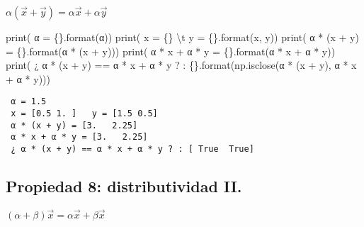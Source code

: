 \documentclass[
  letterpaper,
  DIV=11,
  numbers=noendperiod]{scrreprt}
\newenvironment{Shaded}{\begin{snugshade}}{\end{snugshade}}
\newcommand{\BuiltInTok}[1]{\textcolor[rgb]{0.00,0.23,0.31}{#1}}
\newcommand{\CharTok}[1]{\textcolor[rgb]{0.13,0.47,0.30}{#1}}
\newcommand{\NormalTok}[1]{\textcolor[rgb]{0.00,0.23,0.31}{#1}}
\newcommand{\OperatorTok}[1]{\textcolor[rgb]{0.37,0.37,0.37}{#1}}
\newcommand{\SpecialCharTok}[1]{\textcolor[rgb]{0.37,0.37,0.37}{#1}}
\newcommand{\StringTok}[1]{\textcolor[rgb]{0.13,0.47,0.30}{#1}}
\begin{document}
\(\alpha (\vec{x} + \vec{y}) = \alpha \vec{x} + \alpha \vec{y}\)

\begin{Shaded}
\begin{Highlighting}[]
\BuiltInTok{print}\NormalTok{(}\StringTok{\textquotesingle{} α = }\SpecialCharTok{\{\}}\StringTok{\textquotesingle{}}\NormalTok{.}\BuiltInTok{format}\NormalTok{(α))}
\BuiltInTok{print}\NormalTok{(}\StringTok{\textquotesingle{} x = }\SpecialCharTok{\{\}}\StringTok{ }\CharTok{\textbackslash{}t}\StringTok{ y = }\SpecialCharTok{\{\}}\StringTok{\textquotesingle{}}\NormalTok{.}\BuiltInTok{format}\NormalTok{(x, y))}
\BuiltInTok{print}\NormalTok{(}\StringTok{\textquotesingle{} α * (x + y) = }\SpecialCharTok{\{\}}\StringTok{\textquotesingle{}}\NormalTok{.}\BuiltInTok{format}\NormalTok{(α }\OperatorTok{*}\NormalTok{ (x }\OperatorTok{+}\NormalTok{ y)))}
\BuiltInTok{print}\NormalTok{(}\StringTok{\textquotesingle{} α * x + α * y = }\SpecialCharTok{\{\}}\StringTok{\textquotesingle{}}\NormalTok{.}\BuiltInTok{format}\NormalTok{(α }\OperatorTok{*}\NormalTok{ x }\OperatorTok{+}\NormalTok{ α }\OperatorTok{*}\NormalTok{ y))}
\BuiltInTok{print}\NormalTok{(}\StringTok{\textquotesingle{} ¿ α * (x + y) == α * x + α * y ? : }\SpecialCharTok{\{\}}\StringTok{\textquotesingle{}}\NormalTok{.}\BuiltInTok{format}\NormalTok{(np.isclose(α }\OperatorTok{*}\NormalTok{ (x }\OperatorTok{+}\NormalTok{ y), α }\OperatorTok{*}\NormalTok{ x }\OperatorTok{+}\NormalTok{ α }\OperatorTok{*}\NormalTok{ y)))}
\end{Highlighting}
\end{Shaded}

\begin{verbatim}
 α = 1.5
 x = [0.5 1. ]   y = [1.5 0.5]
 α * (x + y) = [3.   2.25]
 α * x + α * y = [3.   2.25]
 ¿ α * (x + y) == α * x + α * y ? : [ True  True]
\end{verbatim}

\subsection{Propiedad 8: distributividad
II.}\label{propiedad-8-distributividad-ii.}

\((\alpha + \beta) \vec{x} = \alpha \vec{x} + \beta \vec{x}\)
\end{document}
